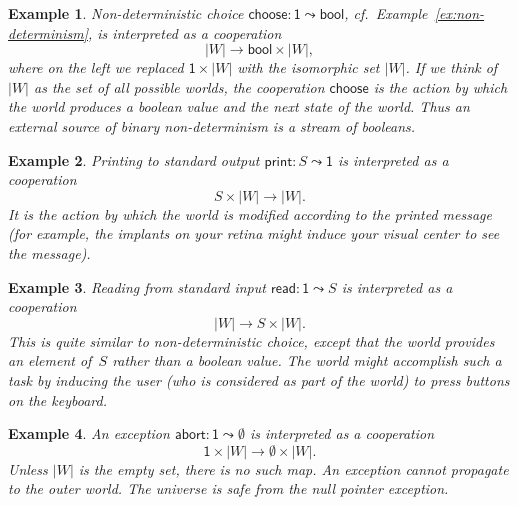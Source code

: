\documentclass{amsart}
\newcommand{\opdecl}[3]{#1 : #2 \leadsto #3} %
\newcommand{\one}{\mathsf{1}} %
\newcommand{\bool}{\mathsf{bool}} %
\newcommand{\kode}[1]{\mathsf{#1}}
\newtheorem{example}{Example}[section]
\begin{document}
\begin{example}
  Non-deterministic choice $\opdecl{\kode{choose}}{\one}{\bool}$, cf.\
  Example~\ref{ex:non-determinism}, is interpreted as a cooperation
  \begin{equation*}
    |W| \to {\bool} \times |W|,
  \end{equation*}
  where on the left we replaced $\one \times |W|$ with the isomorphic set $|W|$.
  If we think of $|W|$ as the set of all possible worlds, the cooperation
  $\kode{choose}$ is the action by which the world produces a boolean value and
  the next state of the world. Thus an external source of binary non-determinism
  is a stream of booleans.
\end{example}

\begin{example}
  Printing to standard output $\opdecl{\kode{print}}{S}{\one}$ is interpreted as
  a cooperation
  \begin{equation*}
    S \times |W| \to |W|.
  \end{equation*}
  It is the action by which the world is modified according to the printed
  message (for example, the implants on your retina might induce your visual
  center to see the message).
\end{example}

\begin{example}
  Reading from standard input $\opdecl{\kode{read}}{\one}{S}$ is interpreted as
  a cooperation
  \begin{equation*}
    |W| \to S \times |W|.
  \end{equation*}
  This is quite similar to non-deterministic choice, except that the world
  provides an element of~$S$ rather than a boolean value. The world might
  accomplish such a task by inducing the user (who is considered as part of the
  world) to press buttons on the keyboard.
\end{example}

\begin{example}
  An exception $\opdecl{\kode{abort}}{\one}{\emptyset}$ is interpreted as a
  cooperation
  \begin{equation*}
    \one \times |W| \to \emptyset \times |W|.
  \end{equation*}
  Unless $|W|$ is the empty set, there is no such map. An exception cannot
  propagate to the outer world. The universe is safe from the null pointer exception.
\end{example}
\end{document}
